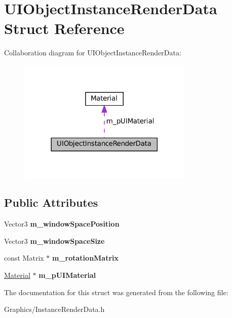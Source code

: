 \hypertarget{structUIObjectInstanceRenderData}{}\section{U\+I\+Object\+Instance\+Render\+Data Struct Reference}
\label{structUIObjectInstanceRenderData}


Collaboration diagram for U\+I\+Object\+Instance\+Render\+Data\+:
\nopagebreak
\begin{figure}[H]
\begin{center}
\leavevmode
\includegraphics[width=237pt]{structUIObjectInstanceRenderData__coll__graph}
\end{center}
\end{figure}
\subsection*{Public Attributes}
\begin{DoxyCompactItemize}
\item 
\mbox{\label{structUIObjectInstanceRenderData_ad218a128ad8b2735b29a72cc454a67b4}} 
Vector3 {\bfseries m\+\_\+window\+Space\+Position}
\item 
\mbox{\label{structUIObjectInstanceRenderData_a7372465eaf8fd23c4e1bdd57eb87359f}} 
Vector3 {\bfseries m\+\_\+window\+Space\+Size}
\item 
\mbox{\label{structUIObjectInstanceRenderData_acfc5d738fd8b12a60748b3a83c79d244}} 
const Matrix $\ast$ {\bfseries m\+\_\+rotation\+Matrix}
\item 
\mbox{\label{structUIObjectInstanceRenderData_ae405b2287d1cebaa3f6a13b88aceee6a}} 
\hyperlink{classMaterial}{Material} $\ast$ {\bfseries m\+\_\+p\+U\+I\+Material}
\end{DoxyCompactItemize}


The documentation for this struct was generated from the following file\+:\begin{DoxyCompactItemize}
\item 
Graphics/Instance\+Render\+Data.\+h\end{DoxyCompactItemize}

